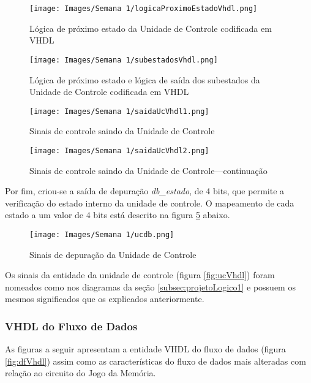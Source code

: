 \documentclass[amsmath,amssymb,floatfix]{report}
\begin{document}
\begin{figure}[H]
    \centering
    \texttt{[image: Images/Semana 1/logicaProximoEstadoVhdl.png]}
    \caption{Lógica de próximo estado da Unidade de Controle codificada em VHDL}
    \label{fig:logicaProximoEstadoVhdl}
\end{figure}

\begin{figure}[H]
    \centering
    \texttt{[image: Images/Semana 1/subestadosVhdl.png]}
    \caption{Lógica de próximo estado e lógica de saída dos subestados da Unidade de Controle codificada em VHDL}
    \label{fig:subestadosVhdl}
\end{figure}

\begin{figure}[H]
    \centering
    \texttt{[image: Images/Semana 1/saidaUcVhdl1.png]}
    \caption{Sinais de controle saindo da Unidade de Controle}
    \label{fig:saidaUcVhdl1}
\end{figure}

\begin{figure}[H]
    \centering
    \texttt{[image: Images/Semana 1/saidaUcVhdl2.png]}
    \caption{Sinais de controle saindo da Unidade de Controle---continuação}
    \label{fig:saidaUcVhdl2}
\end{figure}

Por fim, criou-se a saída de depuração \textit{db\_estado}, de 4 bits, que permite a verificação do estado interno da unidade de controle. O mapeamento de cada estado a um valor de 4 bits está descrito na figura \ref{fig:ucdb} abaixo.

\begin{figure}[H]
    \centering
    \texttt{[image: Images/Semana 1/ucdb.png]}
    \caption{Sinais de depuração da Unidade de Controle}
    \label{fig:ucdb}
\end{figure}

Os sinais da entidade da unidade de controle (figura \ref{fig:ucVhdl}) foram nomeados como nos diagramas da seção \ref{subsec:projetoLogico1} e possuem os mesmos significados que os explicados anteriormente.

\subsubsection{VHDL do Fluxo de Dados}
\label{subsubsec:dfVhdl1}

As figuras a seguir apresentam a entidade VHDL do fluxo de dados (figura \ref{fig:dfVhdl}) assim como as características do fluxo de dados mais alteradas com relação ao circuito do Jogo da Memória.
\end{document}
